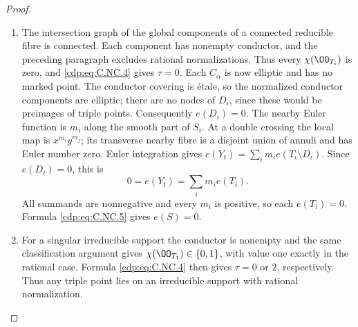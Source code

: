 \begin{proof}
\begin{enumerate}[label=\arabic*.,leftmargin=*]
\item The intersection graph of the global components of a connected reducible fibre is connected. Each component has nonempty conductor, and the preceding paragraph excludes rational normalizations. Thus every $\chi(\OO_{T_i})$ is zero, and \eqref{cdp:eq:C.NC.4} gives $\tau=0$. Each $C_\alpha$ is now elliptic and has no marked point. The conductor covering is étale, so the normalized conductor components are elliptic; there are no nodes of $D_i$, since these would be preimages of triple points. Consequently $e(D_i)=0$. The nearby Euler function is $m_i$ along the smooth part of $S_i$. At a double crossing the local map is $x^{m_i}y^{m_j}$; its transverse nearby fibre is a disjoint union of annuli and has Euler number zero. Euler integration gives $e(Y_t)=\sum_i m_i e(T_i\setminus D_i)$. Since $e(D_i)=0$, this is
\[
 0=e(Y_t)=\sum_i m_i e(T_i).
\]
All summands are nonnegative and every $m_i$ is positive, so each $e(T_i)=0$. Formula \eqref{cdp:eq:C.NC.5} gives $e(S)=0$.

\item For a singular irreducible support the conductor is nonempty and the same classification argument gives $\chi(\OO_{T_1})\in\{0,1\}$, with value one exactly in the rational case. Formula \eqref{cdp:eq:C.NC.4} then gives $\tau=0$ or $2$, respectively. Thus any triple point lies on an irreducible support with rational normalization.

\end{enumerate}
\end{proof}